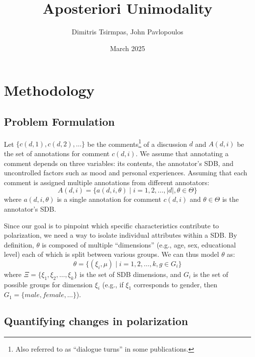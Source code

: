 \documentclass{article}
\title{Aposteriori Unimodality}
\author{Dimitris Tsirmpas, John Pavlopoulos}
\date{March 2025}
\begin{document}
\maketitle

\section{Methodology}

\subsection{Problem Formulation}
\label{ssec:methodology:problem}

Let $\{c(d,1), c(d,2), \ldots\}$ be the comments\footnote{Also referred to as “dialogue turns” in some publications.} of a discussion $d$ and $A(d, i)$ be the set of annotations for comment $c(d, i)$. We assume that annotating a comment depends on three variables: its contents, the annotator's \ac{SDB}, and uncontrolled factors such as mood and personal experiences. Assuming that each comment is assigned multiple annotations from different annotators:
\begin{equation}
    A(d, i) = \{a(d, i, \theta) \mid i=1, 2, \ldots, \lvert d \rvert, \theta \in \Theta \}
\end{equation}
\noindent where  $a(d, i, \theta)$ is a single annotation for comment $c(d,i)$ and $\theta \in \Theta$ is the annotator's \ac{SDB}.

Since our goal is to pinpoint which specific characteristics contribute to polarization, we need a way to isolate individual attributes within a \ac{SDB}. By definition, $\theta$ is composed of multiple ``dimensions'' (e.g., age, sex, educational level) each of which is split between various groups. We can thus model $\theta$ as:
\begin{equation}
    \theta = \{(\xi_i, \mu) \mid i=1, 2, \ldots, k \mathpunct{,} g \in G_i\}
\end{equation} 
\noindent where $\Xi=\{\xi_1, \xi_2, \ldots, \xi_k\}$ is the set of \ac{SDB} dimensions, and $G_i$ is the set of possible groups for dimension $\xi_i$ (e.g., if $\xi_1$ corresponds to gender, then $G_1=\{\textit{male}, \textit{female}, \ldots\}$).


\subsection{Quantifying changes in polarization}
\label{ssec:methodology:polstat}
\end{document}
